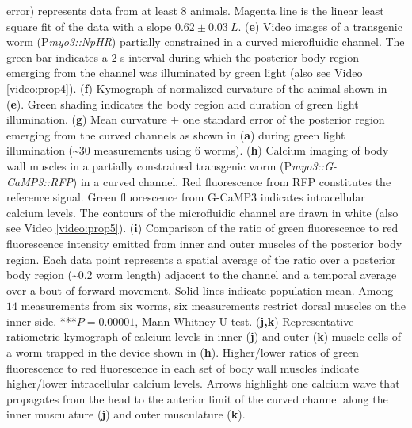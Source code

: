 \begin{FPfigure}
{error) represents data from at least 8 animals. Magenta line is the linear least square fit of the 
data with a slope $0.62 \pm 0.03~L$.  
(\textbf{e}) Video images of a transgenic worm (P\textit{myo3::NpHR}) partially constrained in a curved 
microfluidic channel. The green bar indicates a $2$ s interval during which the posterior body 
region emerging from the channel was illuminated by green light (also see Video  \ref{video:prop4}). 
(\textbf{f}) Kymograph of normalized curvature of the animal shown in (\textbf{e}). Green shading indicates the 
body region and duration of green light illumination.  
(\textbf{g}) Mean curvature $\pm$ one standard error of the posterior region emerging from the curved 
channels as shown in (\textbf{a}) during green light illumination (\textasciitilde$30$ measurements using 6 worms). 
(\textbf{h}) Calcium imaging of body wall muscles in a partially constrained transgenic worm 
(P\textit{myo3::G-CaMP3::RFP}) in a curved channel. Red fluorescence from RFP constitutes the 
reference signal. Green fluorescence from G-CaMP3 indicates intracellular calcium levels. The 
contours of the microfluidic channel are drawn in white (also see Video  \ref{video:prop5}). 
(\textbf{i}) Comparison of the ratio of green fluorescence to red fluorescence intensity emitted from inner 
and outer muscles of the posterior body region. Each data point represents a spatial average of 
the ratio over a posterior body region (\textasciitilde$0.2$ worm length) adjacent to the channel and a temporal 
average over a bout of forward movement. Solid lines indicate population mean. Among $14$ 
measurements from six worms, six measurements restrict dorsal muscles on the inner side. ***$P= 0.00001$, Mann-Whitney U test. 
(\textbf{j,k}) Representative ratiometric kymograph of calcium levels in inner (\textbf{j}) and outer (\textbf{k}) muscle 
cells of a worm trapped in the device shown in (\textbf{h}). Higher/lower ratios of green fluorescence to 
red fluorescence in each set of body wall muscles indicate higher/lower intracellular calcium 
levels. Arrows highlight one calcium wave that propagates from the head to the anterior limit of 
the curved channel along the inner musculature (\textbf{j}) and outer musculature (\textbf{k}).\label{fig:prop2}}
\end{FPfigure}


